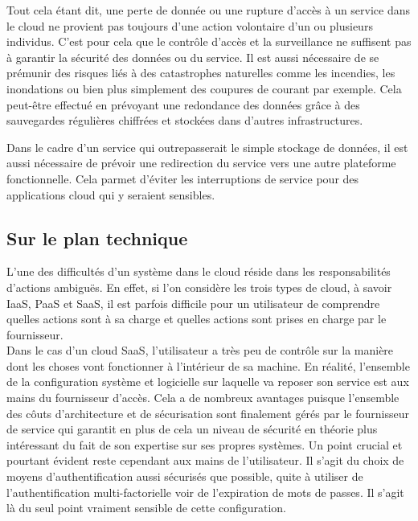 \documentclass[a4paper, 12pt]{article}
\begin{document}
\begin{spacing}{1.1}
      Tout cela étant dit, une perte de donnée ou une rupture d'accès à un
      service dans le cloud ne provient pas toujours d'une action volontaire
      d'un ou plusieurs individus. C'est pour cela que le contrôle d'accès et la
      surveillance ne suffisent pas à garantir la sécurité des données ou
      du service. Il est aussi nécessaire de se prémunir des risques liés à des
      catastrophes naturelles comme les incendies, les inondations ou bien plus
      simplement des coupures de courant par exemple. Cela peut-être
      effectué en prévoyant une redondance des données grâce à des sauvegardes
      régulières chiffrées et stockées dans d'autres infrastructures.

      Dans le cadre d'un service qui outrepasserait le simple stockage de
      données, il est aussi nécessaire de prévoir une redirection du service
      vers une autre plateforme fonctionnelle. Cela parmet d'éviter les
      interruptions de service pour des applications cloud qui y seraient
      sensibles.

    \subsection{Sur le plan technique}
      L'une des difficultés d'un système dans le cloud réside dans les
      responsabilités d'actions ambiguës. En effet, si l'on considère les
      trois types de cloud, à savoir IaaS, PaaS et SaaS, il est parfois
      difficile pour un utilisateur de comprendre quelles actions sont à
      sa charge et quelles actions sont prises en charge par le fournisseur. \\

      Dans le cas d'un cloud SaaS, l'utilisateur a très peu de contrôle sur
      la manière dont les choses vont fonctionner à l'intérieur de sa machine.
      En réalité, l'ensemble de la configuration système et logicielle sur
      laquelle va reposer son service est aux mains du fournisseur d'accès.
      Cela a de nombreux avantages puisque l'ensemble des côuts d'architecture
      et de sécurisation sont finalement gérés par le fournisseur de service qui
      garantit en plus de cela un niveau de sécurité en théorie plus
      intéressant du fait de son expertise sur ses propres systèmes. Un point
      crucial et pourtant évident reste cependant aux mains de l'utilisateur.
      Il s'agit du choix de moyens d'authentification aussi sécurisés que
      possible, quite à utiliser de l'authentification multi-factorielle voir
      de l'expiration de mots de passes. Il s'agit là du seul point vraiment
      sensible de cette configuration. \\


\end{spacing}
\end{document}
